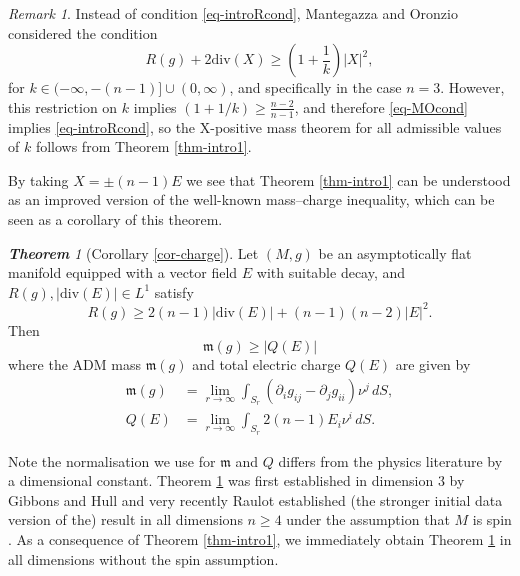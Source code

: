 \documentclass[a4paper,11pt,reqno]{amsart}
\theoremstyle{plain}
\theoremstyle{definition}
\theoremstyle{remark}
\newtheorem{rem}[thm]{Remark}
\newcommand{\m}{\mathfrak{m}}
\numberwithin{equation}{section}
\newtheorem{introthm}{\bf Theorem}
\begin{document}
\begin{rem}
	Instead of condition \eqref{eq-introRcond}, Mantegazza and Oronzio considered the condition
	\begin{equation}\label{eq-MOcond}
		R(g)+2\mathrm{div}(X)\geq\left(1+\frac{1}{k}\right)|X|^2,
	\end{equation} 
	for $k\in(-\infty,-(n-1)]\cup(0,\infty)$, and specifically in the case $n=3$. However, this restriction on $k$ implies $(1+1/k)\geq\frac{n-2}{n-1}$, and therefore \eqref{eq-MOcond} implies \eqref{eq-introRcond}, so the X-positive mass theorem for all admissible values of $k$ follows from Theorem \ref{thm-intro1}.  
\end{rem}


By taking $X=\pm (n-1)E$ we see that Theorem \ref{thm-intro1} can be understood as an improved version of the well-known mass--charge inequality, which can be seen as a corollary of this theorem.
\begin{introthm}[Corollary \ref{cor-charge}]\label{thm-intromasscharge}
	Let $(M,g)$ be an asymptotically flat manifold equipped with a vector field $E$ with suitable decay, and $R(g), |\mathrm{div}(E)|\in L^1$ satisfy
	\begin{equation*}
		R(g)\geq 2(n-1)|\mathrm{div}(E)|+(n-1)(n-2)|E|^2.
	\end{equation*}
	Then
	\begin{equation*}
		\m(g)\geq |Q(E)|
	\end{equation*}
	where the ADM mass $\m(g)$ and total electric charge $Q(E)$ are given by
	\begin{equation}\begin{split}\label{eq-mE}
		\m(g)&=\lim_{r\to \infty}\int_{S_r} \left(\partial_i g_{ij}-\partial_jg_{ii}\right)\nu^j\,dS,\\ Q(E)&=\lim_{r\to\infty}\int_{S_r}2(n-1)E_i\nu^i\,dS.
	\end{split}\end{equation}
\end{introthm}
Note the normalisation we use for $\m$ and $Q$ differs from the physics literature by a dimensional constant. Theorem \ref{thm-intromasscharge} was first established in dimension $3$ by Gibbons and Hull \cite{GibbonsHull1982Bogomolny} and very recently Raulot established (the stronger initial data version of the) result in all dimensions $n\geq4$ under the assumption that $M$ is spin \cite{Raulot2025ChargedSpin}. As a consequence of Theorem \ref{thm-intro1}, we immediately obtain Theorem \ref{thm-intromasscharge} in all dimensions without the spin assumption.
\end{document}
